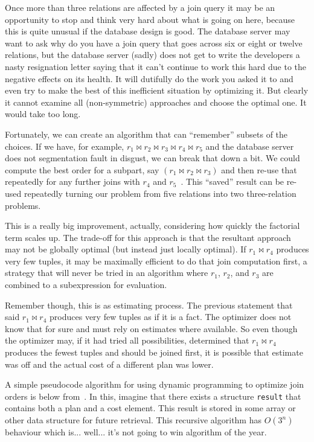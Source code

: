 \documentclass[a4paper]{report}
\begin{document}
Once more than three relations are affected by a join query it may be an opportunity to stop and think very hard about what is going on here, because this is quite unusual if the database design is good. The database server may want to ask why do you have a join query that goes across six or eight or twelve relations, but the database server (sadly) does not get to write the developers a nasty resignation letter saying that it can't continue to work this hard due to the negative effects on its health. It will dutifully do the work you asked it to and even try to make the best of this inefficient situation by optimizing it. But clearly it cannot examine all (non-symmetric) approaches and choose the optimal one. It would take too long.

Fortunately, we can create an algorithm that can ``remember'' subsets of the choices. If we have, for example, $r_{1} \bowtie r_{2} \bowtie r_{3} \bowtie r_{4} \bowtie r_{5}$ and the database server does not segmentation fault in disgust, we can break that down a bit. We could compute the best order for a subpart, say $(r_{1} \bowtie r_{2} \bowtie r_{3})$ and then re-use that repeatedly for any further joins with $r_{4}$ and $r_{5}$~\cite{dsc}. This ``saved'' result can be re-used repeatedly turning our problem from five relations into two three-relation problems.

This is a really big improvement, actually, considering how quickly the factorial term scales up. The trade-off for this approach is that the resultant approach may not be globally optimal (but instead just locally optimal). If $r_{1} \bowtie r_{4}$ produces very few tuples, it may be maximally efficient to do that join computation first, a strategy that will never be tried in an algorithm where $r_{1}$, $r_{2}$, and $r_{3}$ are combined to a subexpression for evaluation. 

Remember though, this is as estimating process. The previous statement that said $r_{1} \bowtie r_{4}$ produces very few tuples as if it is a fact. The optimizer does not know that for sure and must rely on estimates where available. So even though the optimizer may, if it had tried all possibilities, determined that $r_{1} \bowtie r_{4}$ produces the fewest tuples and should be joined first, it is possible that estimate was off and the actual cost of a different plan was lower.

A simple pseudocode algorithm for using dynamic programming to optimize join orders is below from~\cite{dsc}. In this, imagine that there exists a structure \texttt{result} that contains both a plan and a cost element. This result is stored in some array or other data structure for future retrieval. This recursive algorithm has $O(3^{n})$ behaviour which is... well... it's not going to win algorithm of the year.
\end{document}
